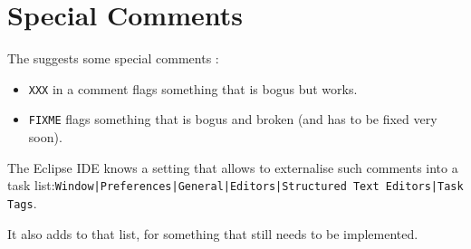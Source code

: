 \chapter{Special Comments}
The \ccjpl suggests some special comments \autocite{SUN_CODE_CONVENTIONS:SpecialComments}:
\begin{itemize}
	\item{\lstinline|XXX| in a comment flags something that is bogus but works.}
	\item{\lstinline|FIXME| flags something that is bogus and broken (and has to be fixed very soon).}
\end{itemize}

The Eclipse IDE knows a setting that allows to externalise such comments into a task list:\texttt{Window|\allowbreak Preferences|\allowbreak General|\allowbreak Editors|\allowbreak Structured Text Editors|\allowbreak Task Tags}.

It also adds  to that list, for something that still needs to be implemented.

